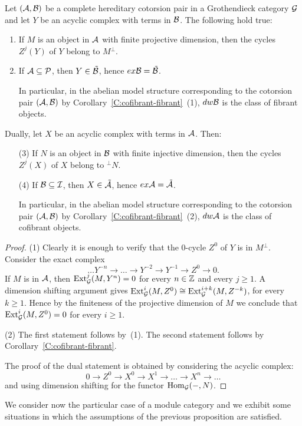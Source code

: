   \begin{prop}\label{P:finite-proj-dim} Let $(\mathcal{A}, \mathcal{B})$ be a complete hereditary cotorsion pair in a Grothendieck category $\mathcal{G}$ and let $Y$ be an acyclic complex with terms in $\mathcal{B}$. The following hold true:
  \begin{enumerate}
  \item If $M$ is an object in $\mathcal{A}$ with finite projective dimension, then the cycles $Z^j(Y)$ of $Y$ belong to $M{}^\perp{}$.
  \item If $\mathcal{A}\subseteq \mathcal{P}$, then $Y\in \tilde {\mathcal{B}}$, hence $ex\mathcal{B}=\tilde {\mathcal{B}}$.

    In particular, in the abelian model structure corresponding to the cotorsion pair $(\mathcal{A}, \mathcal{B})$ by Corollary~\ref{C:cofibrant-fibrant}~(1), $dw \mathcal{B}$ is the class of fibrant objects.
  \end{enumerate}

   Dually, let $X$ be an acyclic complex with terms in $\mathcal{A}$. Then:
   \begin{enumerate}
  \item[(3)] If $N$ is an object in $\mathcal{B}$ with finite injective dimension, then the cycles $Z^j(X)$ of $X$ belong to ${^\perp N}$.
  \item[(4)] If $\mathcal{B}\subseteq \mathcal{I}$, then $X\in \tilde {\mathcal{A}}$, hence $ex\mathcal{A}=\tilde {\mathcal{A}}$.

    In particular, in the abelian model structure corresponding to the cotorsion pair $(\mathcal{A}, \mathcal{B})$ by Corollary~\ref{C:cofibrant-fibrant}~(2), $dw \mathcal{A}$ is the class of cofibrant objects.

  \end{enumerate}

  \end{prop}

  \begin{proof} (1) Clearly it is enough to verify that the $0$-cycle $Z^0$ of $Y$ is in $M{}^\perp{}$.  Consider the exact complex
  \[\dots Y^{-n}\to\dots  \to Y^{-2}\to Y^{-1}\to Z^0\to 0.\]
 If $M$ is in $ \mathcal{A}$, then $\operatorname{Ext}^j_{\mathcal{G}}(M, Y^n)=0$ for every $n\in \mathbb{Z}$ and every $j\geq 1$. A dimension shifting argument gives $\operatorname{Ext}^i_{\mathcal{G}}(M, Z^0)\cong \operatorname{Ext}^{i+k}_{\mathcal{G}}(M, Z^{-k})$, for every $k\geq 1$. Hence by the finiteness of the projective dimension of $M$   we conclude that $\operatorname{Ext}^i_{\mathcal{G}}(M, Z^0)=0$ for every $i\geq 1$.

 (2) The first statement  follows by~(1). The second statement follows by Corollary~\ref{C:cofibrant-fibrant}.

 The proof of the dual statement is obtained by considering the acyclic complex:
 \[0\to Z^0\to X^0\to X^1\to \dots\to X^n\to \dots\]
 and using dimension shifting for the functor $\operatorname{Hom}_{\mathcal{G}}(- ,N)$.

\end{proof}
We consider now the particular case of a module category and
 we exhibit some situations in which the assumptions of the previous proposition are satisfied.

